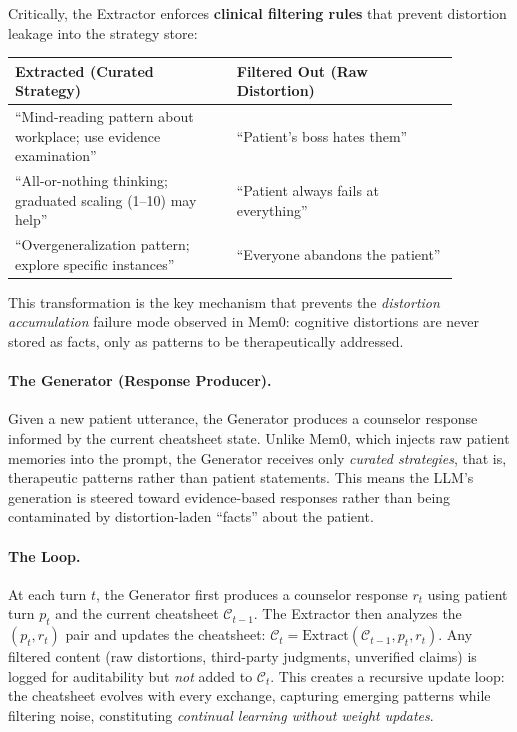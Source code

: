Critically, the Extractor enforces \textbf{clinical filtering rules} that prevent distortion leakage into the strategy store:

\begin{center}
\small
\begin{tabular}{p{0.44\linewidth}p{0.44\linewidth}}
\toprule
\textbf{Extracted (Curated Strategy)} & \textbf{Filtered Out (Raw Distortion)} \\
\midrule
``Mind-reading pattern about workplace; use evidence examination'' & ``Patient's boss hates them'' \\
``All-or-nothing thinking; graduated scaling (1--10) may help'' & ``Patient always fails at everything'' \\
``Overgeneralization pattern; explore specific instances'' & ``Everyone abandons the patient'' \\
\bottomrule
\end{tabular}
\end{center}

This transformation is the key mechanism that prevents the \emph{distortion accumulation} failure mode observed in Mem0: cognitive distortions are never stored as facts, only as patterns to be therapeutically addressed.

\paragraph{The Generator (Response Producer).}
Given a new patient utterance, the Generator produces a counselor response informed by the current cheatsheet state. Unlike Mem0, which injects raw patient memories into the prompt, the Generator receives only \emph{curated strategies}, that is, therapeutic patterns rather than patient statements. This means the LLM's generation is steered toward evidence-based responses rather than being contaminated by distortion-laden ``facts'' about the patient.

\paragraph{The Loop.}
At each turn $t$, the Generator first produces a counselor response $r_t$ using patient turn $p_t$ and the current cheatsheet $\mathcal{C}_{t-1}$. The Extractor then analyzes the $(p_t, r_t)$ pair and updates the cheatsheet: $\mathcal{C}_t = \text{Extract}(\mathcal{C}_{t-1}, p_t, r_t)$. Any filtered content (raw distortions, third-party judgments, unverified claims) is logged for auditability but \emph{not} added to $\mathcal{C}_t$. This creates a recursive update loop: the cheatsheet evolves with every exchange, capturing emerging patterns while filtering noise, constituting \emph{continual learning without weight updates}.

